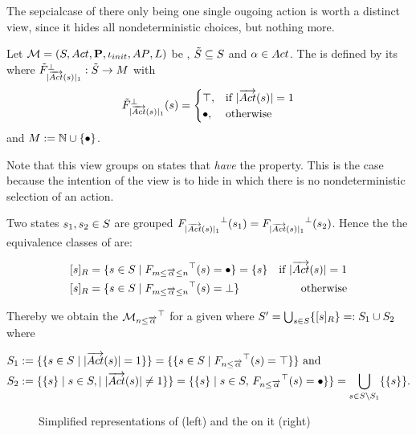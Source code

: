 \documentclass[preview]{standalone}
\begin{document}
The sepcialcase of there only being one single ougoing action is worth a distinct view, since it hides all nondeterministic choices, but nothing more.

\begin{definition}
	Let ${{{\mathcal{M}}}} = {{({S}, {Act}, {\textbf{P}}, {\iota_{init}}, {AP}, {L})}}$ be \achgphN, ${\tilde{{S}}} \subseteq {S}$ and ${\alpha} \in {Act}$. The \viewN \viewoutactsingle is defined by its \grpfctN \gfctoutactsingle where ${{\tilde{F}_{{|{\overrightarrow{{Act}}}({s})|_1}}}^{\bot}} : {\tilde{{S}}} \to {\ensuremath{{M}}}$ with
	\[
	{{\tilde{F}_{{|{\overrightarrow{{Act}}}({s})|_1}}}^{\bot}}({s}) =
	\begin{cases}
		{\top}, &\text{if } |{\overrightarrow{{Act}}}({s})| = 1 \\ 
		{\bullet}, &\text{otherwise}
	\end{cases}
	\]
	and $\imggrp := \natnums \cup \remset$.
\end{definition}

Note that this view groups on states that \emph{have} the property. This is the case because the intention of the view is to hide \states in which there is no nondeterministic selection of an action.

Two states ${s}_1, {s}_2 \in {S}$ are grouped \iffN ${{F_{{|{\overrightarrow{{Act}}}({s})|_1}}}^{\bot}}({s}_1) = {{F_{{|{\overrightarrow{{Act}}}({s})|_1}}}^{\bot}}({s}_2)$. Hence the the equivalence classes of \eqrelview are:

\begin{align*}
	\eqclassv &= \{\state \in \states \mid \gfctspanoutaction(\state) = \remelem\} = \{\state\} &\text{if } |\outacts(\state)|=1 \\
	\eqclassv &= \{\state \in \states \mid \gfctspanoutaction(\state) = \notppty\} &\text{ otherwise}	
\end{align*}

Thereby we obtain the \viewN ${{{{{\mathcal{M}}}}_{{{n}\leq{\overrightarrow{\ensuremath{{\alpha}}}}}}}^{\top}}$ for a given \chgphN \chgph where ${S}' = \bigcup_{{s} \in {S}} \{{{[{s}]_{{R}}}}\} =: {S}_1 \cup {S}_2$ where 

\begin{align*}
	\states_1 &:= \{\{ \state \in \states \mid |\outacts(\state)| = 1\}\} = \{\{\state \in \states \mid \gfctminoutaction(\state) = \hasppty\}\}  \text{   and} \\
	\states_2 &:= \{\{\state\} \mid \state \in \states, \mid |\outacts(\state)| \neq 1\}\} = \{\{\state\} \mid \state \in \states, \, \gfctminoutaction(\state) = \remelem\}\} = \nogroupstates[\states_1].
\end{align*}

\begin{figure}[h]
	\begin{minipage}{.5\textwidth}
		\hspace{5mm}
		
	\end{minipage}%
	\begin{minipage}{.5\textwidth}						
		\centering
		
	\end{minipage}	
	\caption{Simplified representations of \mdp (left) and the \viewN \viewoutactsetsize on it (right)}	
	\label{fig:outActSingle}  	
\end{figure}
\end{document}
